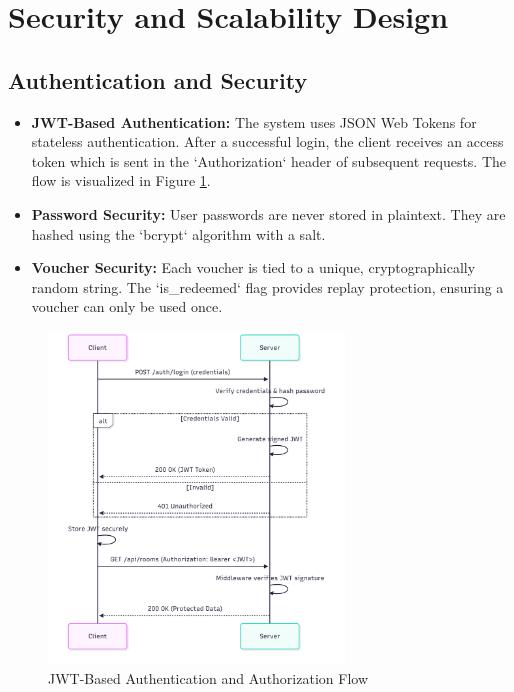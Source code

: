 \section{Security and Scalability Design}
\label{sec:arch-security-scalability}

\subsection{Authentication and Security}
\begin{itemize}
    \item \textbf{JWT-Based Authentication:} The system uses JSON Web Tokens for stateless authentication. After a successful login, the client receives an access token which is sent in the `Authorization` header of subsequent requests. The flow is visualized in Figure \ref{fig:jwt-flow}.
    \item \textbf{Password Security:} User passwords are never stored in plaintext. They are hashed using the `bcrypt` algorithm with a salt.
    \item \textbf{Voucher Security:} Each voucher is tied to a unique, cryptographically random string. The `is_redeemed` flag provides replay protection, ensuring a voucher can only be used once.
\end{itemize}

\begin{figure}[htbp]
\centering
\includegraphics[width=0.7\textwidth]{figures/jwt-flow.png}
\caption{JWT-Based Authentication and Authorization Flow}
\label{fig:jwt-flow}
\end{figure}

